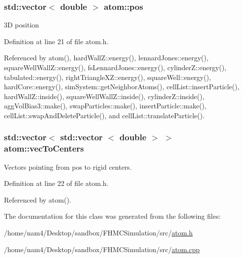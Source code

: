 \hypertarget{classatom_a3ae5f4880e7831d8b2c9fda72b4eb24a}{
\subsubsection[{pos}]{\setlength{\rightskip}{0pt plus 5cm}std\-::vector$<$ double $>$ atom\-::pos}}\label{classatom_a3ae5f4880e7831d8b2c9fda72b4eb24a}


3\-D position 



Definition at line 21 of file atom.\-h.



Referenced by atom(), hard\-Wall\-Z\-::energy(), lennard\-Jones\-::energy(), square\-Well\-Wall\-Z\-::energy(), fs\-Lennard\-Jones\-::energy(), cylinder\-Z\-::energy(), tabulated\-::energy(), right\-Triangle\-X\-Z\-::energy(), square\-Well\-::energy(), hard\-Core\-::energy(), sim\-System\-::get\-Neighbor\-Atoms(), cell\-List\-::insert\-Particle(), hard\-Wall\-Z\-::inside(), square\-Well\-Wall\-Z\-::inside(), cylinder\-Z\-::inside(), agg\-Vol\-Bias3\-::make(), swap\-Particles\-::make(), insert\-Particle\-::make(), cell\-List\-::swap\-And\-Delete\-Particle(), and cell\-List\-::translate\-Particle().

\hypertarget{classatom_a1376d52933b59a61ef76bf47f3f3732f}{
\subsubsection[{vec\-To\-Centers}]{\setlength{\rightskip}{0pt plus 5cm}std\-::vector$<$ std\-::vector $<$ double $>$ $>$ atom\-::vec\-To\-Centers}}\label{classatom_a1376d52933b59a61ef76bf47f3f3732f}


Vectors pointing from pos to rigid centers. 



Definition at line 22 of file atom.\-h.



Referenced by atom().



The documentation for this class was generated from the following files\-:\begin{DoxyCompactItemize}
\item 
/home/nam4/\-Desktop/sandbox/\-F\-H\-M\-C\-Simulation/src/\hyperlink{atom_8h}{atom.\-h}\item 
/home/nam4/\-Desktop/sandbox/\-F\-H\-M\-C\-Simulation/src/\hyperlink{atom_8cpp}{atom.\-cpp}\end{DoxyCompactItemize}
